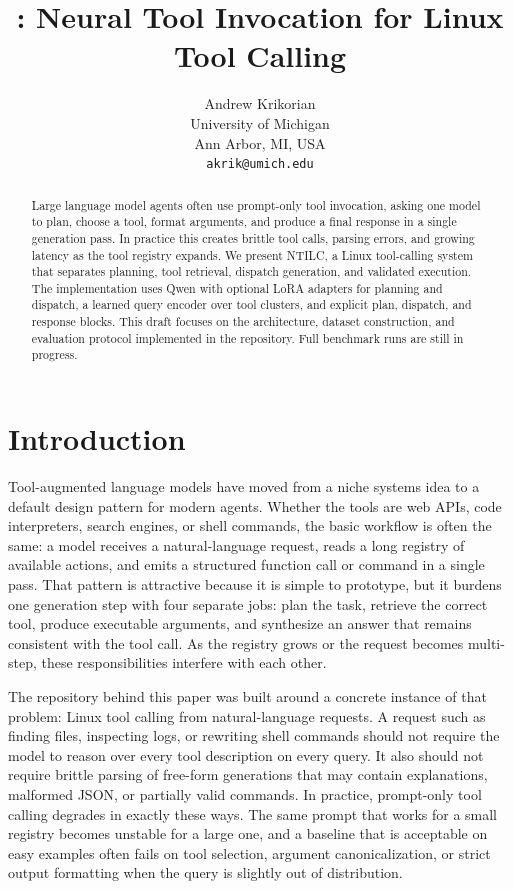 \documentclass[10pt,twocolumn,letterpaper]{article}
\title{\method: Neural Tool Invocation for Linux Tool Calling}
\author{
Andrew Krikorian \\
University of Michigan \\
Ann Arbor, MI, USA \\
\texttt{akrik@umich.edu}
}
\date{}
\newcommand{\method}{NTILC}
\begin{document}
\maketitle

\begin{abstract}
Large language model agents often use prompt-only tool invocation, asking one model to plan, choose a tool, format arguments, and produce a final response in a single generation pass. In practice this creates brittle tool calls, parsing errors, and growing latency as the tool registry expands. We present \method, a Linux tool-calling system that separates planning, tool retrieval, dispatch generation, and validated execution. The implementation uses Qwen with optional LoRA adapters for planning and dispatch, a learned query encoder over tool clusters, and explicit plan, dispatch, and response blocks. This draft focuses on the architecture, dataset construction, and evaluation protocol implemented in the repository. Full benchmark runs are still in progress.
\end{abstract}

\section{Introduction}
Tool-augmented language models have moved from a niche systems idea to a default design pattern for modern agents. Whether the tools are web APIs, code interpreters, search engines, or shell commands, the basic workflow is often the same: a model receives a natural-language request, reads a long registry of available actions, and emits a structured function call or command in a single pass. That pattern is attractive because it is simple to prototype, but it burdens one generation step with four separate jobs: plan the task, retrieve the correct tool, produce executable arguments, and synthesize an answer that remains consistent with the tool call. As the registry grows or the request becomes multi-step, these responsibilities interfere with each other.

The repository behind this paper was built around a concrete instance of that problem: Linux tool calling from natural-language requests. A request such as finding files, inspecting logs, or rewriting shell commands should not require the model to reason over every tool description on every query. It also should not require brittle parsing of free-form generations that may contain explanations, malformed JSON, or partially valid commands. In practice, prompt-only tool calling degrades in exactly these ways. The same prompt that works for a small registry becomes unstable for a large one, and a baseline that is acceptable on easy examples often fails on tool selection, argument canonicalization, or strict output formatting when the query is slightly out of distribution.
\end{document}

